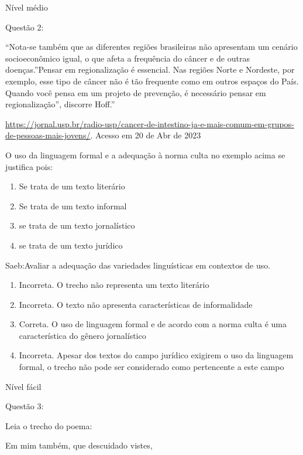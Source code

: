 {Nível médio

Questão 2:

``Nota-se também que as diferentes regiões brasileiras não apresentam um
cenário socioeconômico igual, o que afeta a frequência do câncer e de
outras doenças.''Pensar em regionalização é essencial. Nas regiões Norte
e Nordeste, por exemplo, esse tipo de câncer não é tão frequente como em
outros espaços do País. Quando você pensa em um projeto de prevenção, é
necessário pensar em regionalização'', discorre Hoff.''

\href{https://jornal.usp.br/radio-usp/cancer-de-intestino-ja-e-mais-comum-em-grupos-de-pessoas-mais-jovens/}{\uline{https://jornal.usp.br/radio-usp/cancer-de-intestino-ja-e-mais-comum-em-grupos-de-pessoas-mais-jovens/}}.
Acesso em 20 de Abr de 2023

O uso da linguagem formal e a adequação à norma culta no exemplo acima
se justifica pois:

\begin{enumerate}
\def\labelenumi{\alph{enumi})}
\item
  Se trata de um texto literário
\item
  Se trata de um texto informal
\item
  se trata de um texto jornalístico
\item
  se trata de um texto jurídico
\end{enumerate}

Saeb:Avaliar a adequação das variedades linguísticas em contextos de
uso.

\begin{enumerate}
\def\labelenumi{\arabic{enumi}.}
\item
  Incorreta. O trecho não representa um texto literário
\item
  Incorreta. O texto não apresenta características de informalidade
\item
  Correta. O uso de linguagem formal e de acordo com a norma culta é uma
  característica do gênero jornalístico
\item
  Incorreta. Apesar dos textos do campo jurídico exigirem o uso da
  linguagem formal, o trecho não pode ser considerado como pertencente a
  este campo
\end{enumerate}

Nível fácil

Questão 3:

Leia o trecho do poema:

Em mim também, que descuidado vistes,

}
